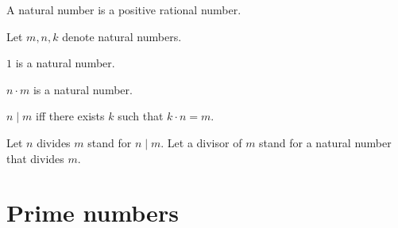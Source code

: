 \documentclass[english]{article}
\begin{document}
  \begin{forthel}
    \begin{signature}
      A natural number is a positive rational number.
    \end{signature}

    Let $m, n, k$ denote natural numbers.

    \begin{signature}
        $1$ is a natural number.
    \end{signature}

    \begin{axiom}
      $n \cdot m$ is a natural number.
    \end{axiom}

    \begin{definition}
      $n \mid m$ iff there exists $k$ such that $k \cdot n = m$.
    \end{definition}

    Let $n$ divides $m$ stand for $n \mid m$.
    Let a divisor of $m$ stand for a natural number that divides $m$.
  \end{forthel}

  \section*{Prime numbers}
\end{document}
